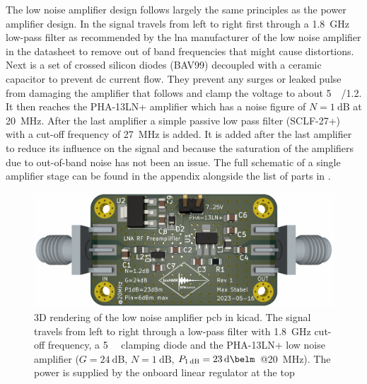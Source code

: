 The low noise amplifier design follows largely the same principles as the power amplifier design. In  the signal travels from left to right first through a \qty{1.8}{\giga\hertz} low-pass filter as recommended by the \acrshort{lna} manufacturer of the low noise amplifier in the datasheet to remove out of band frequencies that might cause distortions. Next is a set of crossed silicon diodes (BAV99) decoupled with a ceramic capacitor to prevent \acrshort{dc} current flow. They prevent any surges or leaked pulse from damaging the amplifier that follows and clamp the voltage to about \qty{+5}{\deci\belm}/\qty{1.2}{\vpp}. It then reaches the PHA-13LN+ amplifier which has a noise figure of \(N = \qty{1}{\deci\bel}\) at \qty{20}{\mega\hertz}. After the last amplifier a simple passive low pass filter (SCLF-27+) with a cut-off frequency of \qty{27}{\mega\hertz} is added. It is added after the last amplifier to reduce its influence on the signal and because the saturation of the amplifiers due to out-of-band noise has not been an issue. The full schematic of a single amplifier stage can be found in the appendix  alongside the list of parts in .

\begin{figure}[hbt]
    \centering
    \includegraphics[width=\textwidth]{images/preamp.png}
    \caption{ 3D rendering of the low noise amplifier \acrshort{pcb} in \gls{kicad}. The signal travels from left to right through a low-pass filter with \qty{1.8}{\giga\hertz} cut-off frequency, a \qty{+5}{\deci\belm} clamping diode and the PHA-13LN+ low noise amplifier (\(G = \qty{24}{\deci\bel}\), \(N = \qty{1}{\deci\bel}\), \(P_{\qty{1}{\deci\bel}} = \qty{23}{\deci\belm}\) @\qty{20}{\mega\hertz}). The power is supplied by the onboard linear regulator at the top}
\end{figure}

